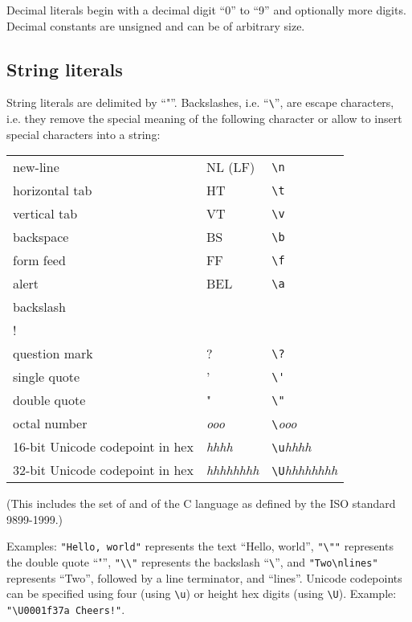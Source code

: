 Decimal literals begin with a decimal digit ``0'' to ``9'' and
optionally more digits. Decimal constants are unsigned and can
be of arbitrary size.

\subsection{String literals}

String literals are delimited by ``"''. Backslashes,
i.e. ``\lstinline!\!'',
are escape characters, i.e. they remove the special meaning of
the following character or allow to insert special characters into a
string:

\bigskip

\noindent
\begin{tabular}{| l l l |}
\hline
new-line & NL (LF) & \lstinline!\n! \\
horizontal tab & HT & \lstinline!\t! \\
vertical tab & VT & \lstinline!\v! \\
backspace & BS & \lstinline!\b! \\
form feed & FF & \lstinline!\f! \\
alert & BEL & \lstinline!\a! \\
backslash & \backslashSY{} & \lstinline!\\! \\
question mark & ? & \lstinline!\?! \\
single quote & ' & \lstinline!\'! \\
double quote & " & \lstinline!\"! \\
octal number & \textit{ooo} & \lstinline!\!\textit{ooo} \\
16-bit Unicode codepoint in hex & \textit{hhhh} & \lstinline!\u!\textit{hhhh} \\
32-bit Unicode codepoint in hex & \textit{hhhhhhhh}
   & \lstinline!\U!\textit{hhhhhhhh} \\
\hline
\end{tabular}

\bigskip

\noindent
(This includes the set of  and
 of the C language as defined
by the ISO standard 9899-1999.)

Examples: \lstinline!"Hello, world"! represents the text ``Hello, world'',
\lstinline!"\""! represents the double quote ``"'',
\lstinline!"\\"! represents the backslash ``\lstinline!\!'',
and \lstinline!"Two\nlines"! represents ``Two'', followed by
a line terminator, and ``lines''. Unicode codepoints can be
specified using four (using \lstinline!\u!) or height hex digits
(using \lstinline!\U!). Example: \lstinline^"\U0001f37a Cheers!"^.

